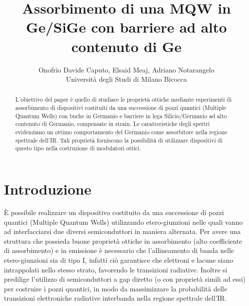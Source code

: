\documentclass[journal]{IEEEtran}
\begin{document}
\title{Assorbimento di una MQW in Ge/SiGe con barriere 
ad alto contenuto di Ge}

\author{Onofrio Davide Caputo, Elsaid Meaj, Adriano Notarangelo
    \\ Università degli Studi di Milano Bicocca}

\maketitle

\begin{abstract}
L’obiettivo del paper è quello di studiare le proprietà ottiche mediante esperimenti di assorbimento di dispositivi costituiti da una successione di pozzi quantici (Multiple Quantum Wells) con buche in Germanio e barriere in lega Silicio/Germanio ad alto contenuto di Germanio, compensate in strain.
Le caratteristiche degli spettri evidenziano un ottimo comportamento del Germanio come assorbitore nella regione spettrale dell'IR. Tali proprietà forniscono la possibilità di utilizzare dispositivi di questo tipo nella costruzione di modulatori ottici.

\end{abstract}


\IEEEpeerreviewmaketitle

\section{Introduzione}

È possibile realizzare un dispositivo costituito da una successione di pozzi quantici 
(Multiple Quantum Wells) utilizzando etero-giunzioni nelle quali vanno ad interfacciarsi due diversi semiconduttori in maniera alternata.
Per avere una struttura che possieda buone proprietà ottiche in assorbimento (alto coefficiente di assorbimento) e in emissione è necessario che l'allineamento di banda nelle etero-giunzioni sia di tipo I, infatti ciò garantisce che elettroni e lacune siano intrappolati nello stesso strato, favorendo le transizioni radiative. Inoltre si predilige l'utilizzo di semiconduttori a gap diretto (o con proprietà simili ad essi) per costruire i pozzi quantici, in modo da massimizzare la probabilità delle transizioni elettroniche radiative interbanda nella regione spettrale dell'IR.
\end{document}

